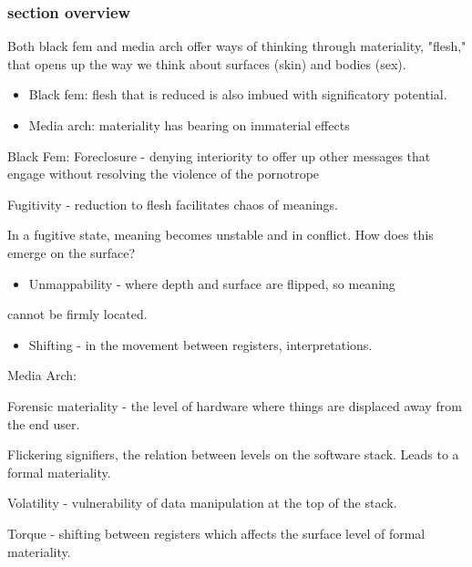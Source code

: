 \documentclass[11pt]{article}
\begin{document}
\subsubsection{section overview}
\label{sec:org213a80b}
Both black fem and media arch offer ways of thinking through
materiality, "flesh," that opens up the way we think about surfaces
(skin) and bodies (sex).
\begin{itemize}
\item Black fem: flesh that is reduced is also imbued with significatory
potential.
\item Media arch: materiality has bearing on immaterial effects
\end{itemize}

Black Fem: 
  Foreclosure - denying interiority to offer up other messages that
  engage without resolving the violence of the pornotrope

Fugitivity - reduction to flesh facilitates chaos of meanings.

In a fugitive state, meaning becomes unstable and in conflict. How
does this emerge on the surface?
\begin{itemize}
\item Unmappability - where depth and surface are flipped, so meaning
\end{itemize}
cannot be firmly located.
\begin{itemize}
\item Shifting - in the movement between registers, interpretations.
\end{itemize}

Media Arch:

Forensic materiality - the level of hardware where things are
displaced away from the end user.

Flickering signifiers, the relation between levels on the software
stack. Leads to a formal materiality. 

Volatility - vulnerability of data manipulation at the top of the
stack. 

Torque - shifting between registers which affects the surface level of
formal materiality. 
\end{document}
